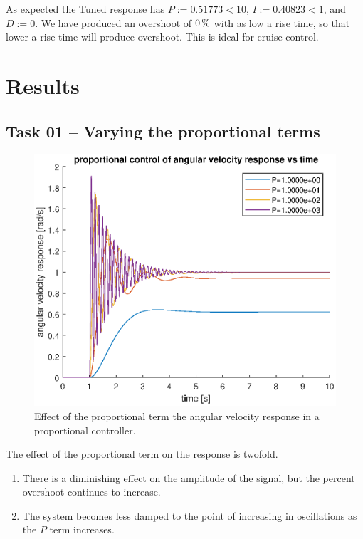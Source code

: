 \documentclass[12pt]{article}
\begin{document}
As expected the Tuned response has
$P := 0.51773 < 10$,
$I := 0.40823 < 1$,
and $D := 0$.
We have produced an overshoot of $\SI0\percent$
with as low a rise time, so that lower a rise time will produce overshoot.
This is ideal for cruise control.

\section{Results}

\subsection{Task 01 -- Varying the proportional terms}

\begin{figure}
    \centering
    \includegraphics[width=\linewidth]{img/task01_varying_p.eps}
    \caption{Effect of the proportional term the angular velocity response in a proportional controller.}
    \label{fig:p on angular velocity}
\end{figure}

The effect of the proportional term on the response is twofold.
\begin{enumerate}
    \item There is a diminishing effect on the amplitude of the signal, but the percent overshoot continues to increase.
    \item The system becomes less damped to the point of increasing in oscillations as the $P$ term increases.
\end{enumerate}
\end{document}
